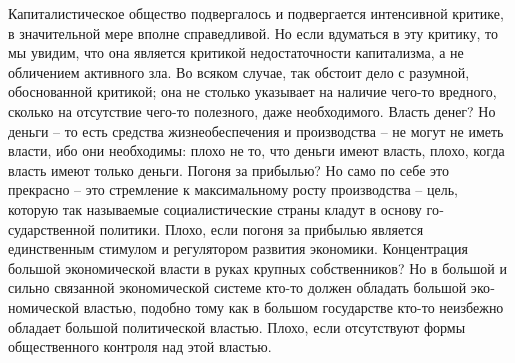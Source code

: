 \documentclass{book}
\begin{document}
Капиталистическое общество подвергалось и подвергается интенсивной критике, в значительной мере вполне справедли­вой. Но если вдуматься в эту критику, то мы увидим, что она является критикой недостаточности капитализма,  а не обличе­нием активного зла. Во всяком случае, так обстоит дело с ра­зумной, обоснованной критикой; она не столько указывает на наличие чего-то вредного, сколько на отсутствие чего-то полезного, даже необходимого. Власть денег? Но деньги -- то есть средства жизнеобеспечения и производства -- не могут не иметь власти, ибо они необходимы: плохо не то, что деньги имеют власть, плохо, когда власть имеют только  деньги. По­гоня за прибылью? Но само по себе это прекрасно -- это стрем­ление к максимальному росту производства -- цель, которую так называемые социалистические страны кладут в основу го­сударственной политики. Плохо, если погоня за прибылью яв­ляется единственным  стимулом и регулятором развития эко­номики. Концентрация большой экономической власти в руках крупных собственников? Но в 
большой и сильно связанной экономической системе кто-то должен обладать большой эко­номической властью, подобно тому как в большом государст­ве кто-то неизбежно обладает большой политической властью. Плохо, если отсутствуют формы общественного контроля  над этой властью.
\end{document}
